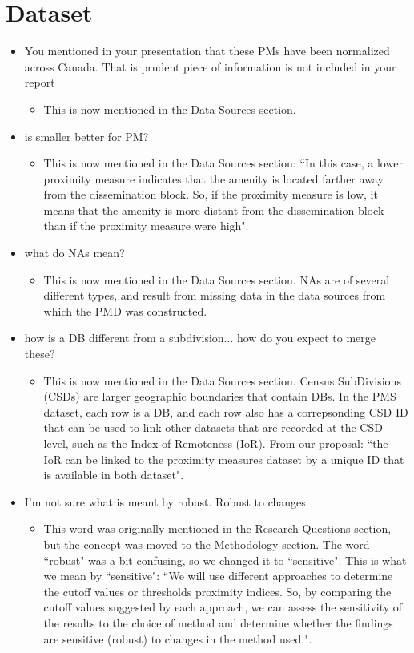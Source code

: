\documentclass[11pt, a4paper]{article}
\begin{document}
\section*{Dataset}

\begin{itemize}
\item You mentioned in your presentation that these PMs have been normalized across Canada. That is prudent piece of information is not included in your report
\begin{itemize}
\item This is now mentioned in the Data Sources section. 
\end{itemize}
\item is smaller better for PM? 
\begin{itemize}
\item This is now mentioned in the Data Sources section: ``In this case, a lower proximity measure indicates that the amenity is located farther away from the dissemination block. So, if the proximity measure is low, it means that the amenity is more distant from the dissemination block than if the proximity measure were high". 
\end{itemize}
\item what do NAs mean? 
\begin{itemize}
\item This is now mentioned in the Data Sources section. NAs are of several different types, and result from missing data in the data sources from which the PMD was constructed. 
\end{itemize}
\item how is a DB different from a subdivision... how do you expect to merge these? 
\begin{itemize}
\item This is now mentioned in the Data Sources section. Census SubDivisions (CSDs) are larger geographic boundaries that contain DBs. In the PMS dataset, each row is a DB, and each row also has a correpsonding CSD ID that can be used to link other datasets that are recorded at the CSD level, such as the Index of Remoteness (IoR). From our proposal: ``the IoR can be linked to the proximity measures dataset by a unique ID that is available in both dataset". 
\end{itemize}
\item I'm not sure what is meant by robust. Robust to changes 
\begin{itemize}
\item This word was originally mentioned in the Research Questions section, but the concept was moved to the Methodology section. The word ``robust" was a bit confusing, so we changed it to ``sensitive". This is what we mean by ``sensitive": ``We will use different approaches to determine the cutoff values or thresholds proximity indices. So, by comparing the cutoff values suggested by each approach, we can assess the sensitivity of the results to the choice of method and determine whether the findings are sensitive (robust) to changes in the method used.". 
\end{itemize}
\end{itemize}
\end{document}

